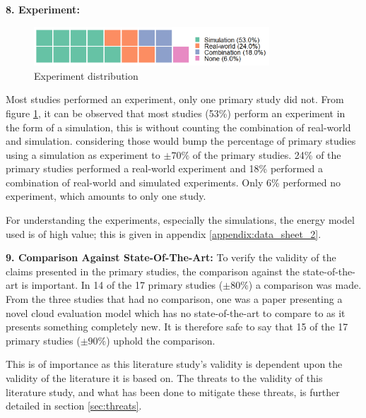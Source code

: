 \noindent\textbf{8. Experiment:}
\begin{figure}
    \includegraphics[width=250pt]{figures/waffle_exp_freq.png}
    \caption{Experiment distribution}
    \label{fig:experiment_distr}
\end{figure}
Most studies performed an experiment, only one primary study did not.
From figure \ref{fig:experiment_distr}, it can be observed that most studies (53\%) perform an experiment in the form of a simulation, 
this is without counting the combination of real-world and simulation.
considering those would bump the percentage of primary studies using a simulation as experiment to $\pm 70\%$ of the primary studies.
24\% of the primary studies performed a real-world experiment and 18\% performed a combination of real-world and simulated experiments.
Only 6\% performed no experiment, which amounts to only one study.

\vspace{2mm}

For understanding the experiments, especially the simulations, the energy model used is of high value; this is given in appendix \ref{appendix:data_sheet_2}.

\vspace{5mm}

\noindent\textbf{9. Comparison Against State-Of-The-Art:}
To verify the validity of the claims presented in the primary studies, the comparison against the state-of-the-art is important.
In 14 of the 17 primary studies ($\pm 80\%$) a comparison was made.
From the three studies that had no comparison, one was a paper presenting a novel cloud evaluation model \cite{hou2017novel_cloud_evaluation_model}
which has no state-of-the-art to compare to as it presents something completely new. 
It is therefore safe to say that 15 of the 17 primary studies ($\pm 90\%$) uphold the comparison.

\vspace{2mm}

\noindent This is of importance as this literature study's validity is dependent upon the validity of the literature it is based on.
The threats to the validity of this literature study, and what has been done to mitigate these threats,
is further detailed in section \ref{sec:threats}.

